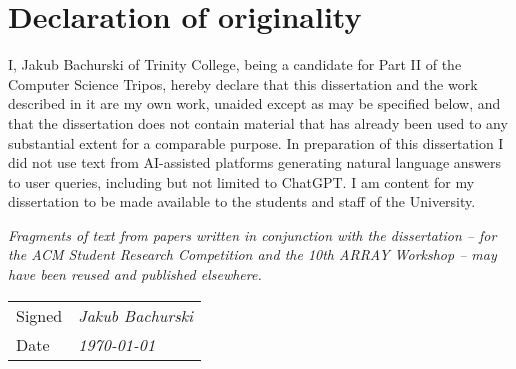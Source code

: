 \section*{Declaration of originality}

I, Jakub Bachurski of Trinity College, being a candidate for Part II of the Computer Science Tripos, hereby declare that this dissertation and the work described in it are my own work, unaided except as may be specified below, and that the dissertation does not contain material that has already been used to any substantial extent for a comparable purpose. In preparation of this dissertation I did not use text from AI-assisted platforms generating natural language answers to user queries, including but not limited to ChatGPT. I am content for my dissertation to be made available to the students and staff of the University.

\vspace{1em}
\textit{\color{blue} Fragments of text from papers written in conjunction with the dissertation -- for the ACM Student Research Competition and the 10th ARRAY Workshop -- may have been reused and published elsewhere.}

\vspace{1cm}
\begin{tabular}{ll}
    Signed & \textit{Jakub Bachurski} \\
    Date & \textit{\today}
\end{tabular}

